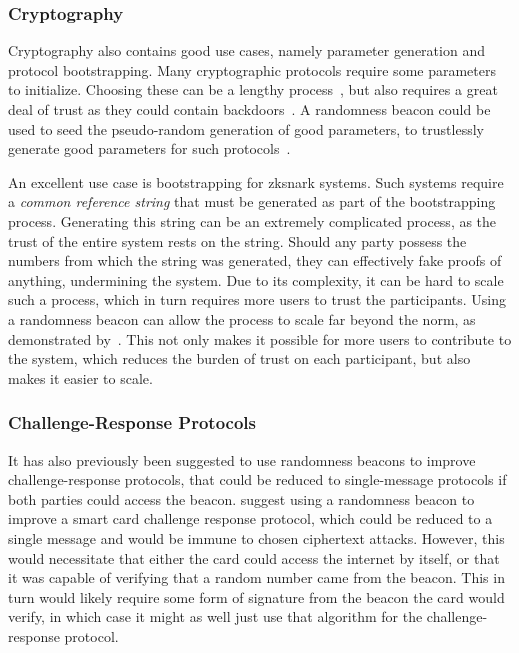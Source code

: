 \subsubsection{Cryptography}
Cryptography also contains good use cases, namely parameter generation and protocol bootstrapping.
Many cryptographic protocols require some parameters to initialize.
Choosing these can be a lengthy process~\cite{mpcsnarks}, but also requires a great deal of trust as they could contain backdoors~\cite{nist2014backdoor}.
A randomness beacon could be used to seed the pseudo-random generation of good parameters, to trustlessly generate good parameters for such protocols~\cite{baigneres2015trap}.

An excellent use case is bootstrapping for \gls{zksnark} systems. Such systems require a \emph{common reference string} that must be generated as part of the bootstrapping process. Generating this string can be an extremely complicated process, as the trust of the entire system rests on the string. Should any party possess the numbers from which the string was generated, they can effectively fake proofs of anything, undermining the system. Due to its complexity, it can be hard to scale such a process, which in turn requires more users to trust the participants. Using a randomness beacon can allow the process to scale far beyond the norm, as demonstrated by~\citet{mpcsnarks}. This not only makes it possible for more users to contribute to the system, which reduces the burden of trust on each participant, but also makes it easier to scale.

\subsubsection{Challenge-Response Protocols}
It has also previously been suggested to use randomness beacons to improve challenge-response protocols, that could be reduced to single-message protocols if both parties could access the beacon.
\citet{fischer2011publicrandomnessservice} suggest using a randomness beacon to improve a smart card challenge response protocol, which could be reduced to a single message and would be immune to chosen ciphertext attacks. However, this would necessitate that either the card could access the internet by itself, or that it was capable of verifying that a random number came from the beacon. This in turn would likely require some form of signature from the beacon the card would verify, in which case it might as well just use that algorithm for the challenge-response protocol. %



